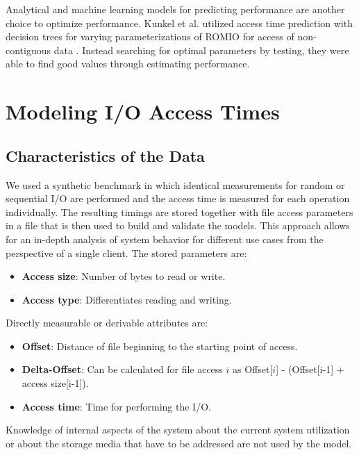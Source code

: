 \documentclass{superfri}
\begin{document}
Analytical and machine learning models for predicting performance are another choice to optimize performance.
Kunkel et al. utilized access time prediction with decision trees for varying parameterizations of ROMIO for access of non-contiguous data \cite{UMLTPTPONI15}. 
Instead searching for optimal parameters by testing, they were able to find good values through estimating performance.


\section{Modeling I/O Access Times}
\label{modeling_access_times}
\subsection{Characteristics of the Data}
We used a synthetic benchmark in which identical measurements for random or sequential I/O are performed and the access time is measured for each operation individually.
The resulting timings are stored together with file access parameters in a file that is then used to build and validate the models.
This approach allows for an in-depth analysis of system behavior for different use cases from the perspective of a single client.
The stored parameters are:
\begin{itemize}
	\item \textbf{Access size}: Number of bytes to read or write.
	\item \textbf{Access type}: Differentiates reading and writing.
\end{itemize}
Directly measurable or derivable attributes are:
\begin{itemize}
	\item \textbf{Offset}: Distance of file beginning to the starting point of access.
	\item \textbf{Delta-Offset}: Can be calculated for file access $i$ as Offset[$i$] - (Offset[i-1] + access size[i-1]).
	\item \textbf{Access time}: Time for performing the I/O.
\end{itemize}
Knowledge of internal aspects of the system about the current system utilization or about the storage media that have to be addressed are not used by the model.
\end{document}

